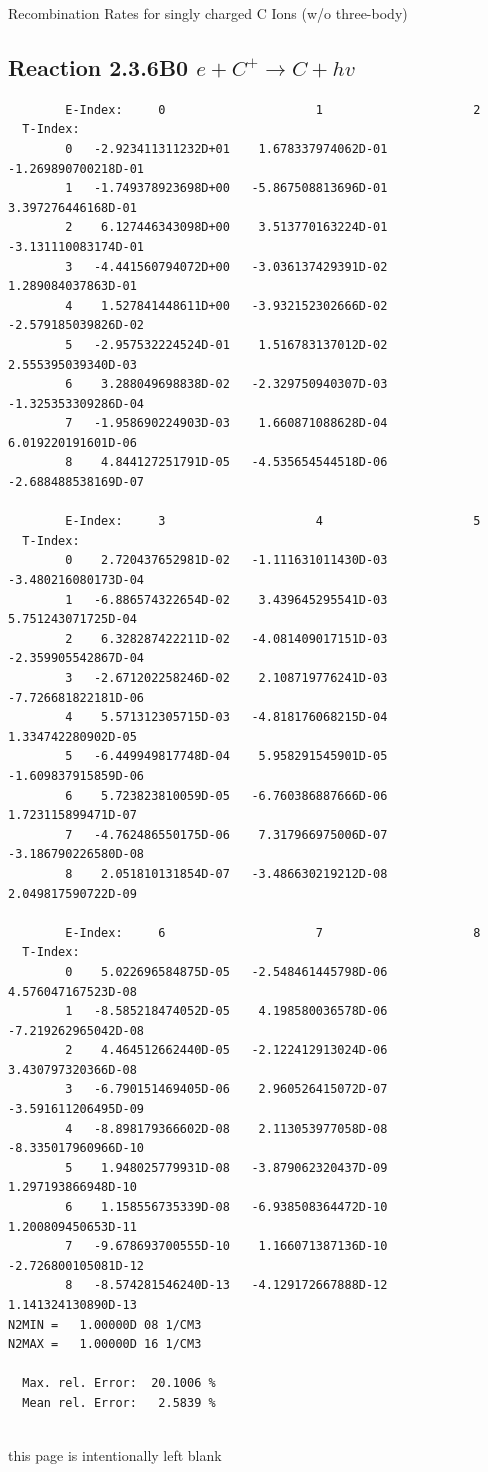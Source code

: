 \documentclass[12pt,dvipdfmx]{article}
\begin{document}
  Recombination Rates for singly charged C Ions (w/o three-body)
\subsection{
Reaction 2.3.6B0  $e + C^{+} \rightarrow C + hv$
}

\begin{small}\begin{verbatim}
        E-Index:     0                     1                     2
  T-Index:
        0   -2.923411311232D+01    1.678337974062D-01   -1.269890700218D-01
        1   -1.749378923698D+00   -5.867508813696D-01    3.397276446168D-01
        2    6.127446343098D+00    3.513770163224D-01   -3.131110083174D-01
        3   -4.441560794072D+00   -3.036137429391D-02    1.289084037863D-01
        4    1.527841448611D+00   -3.932152302666D-02   -2.579185039826D-02
        5   -2.957532224524D-01    1.516783137012D-02    2.555395039340D-03
        6    3.288049698838D-02   -2.329750940307D-03   -1.325353309286D-04
        7   -1.958690224903D-03    1.660871088628D-04    6.019220191601D-06
        8    4.844127251791D-05   -4.535654544518D-06   -2.688488538169D-07

        E-Index:     3                     4                     5
  T-Index:
        0    2.720437652981D-02   -1.111631011430D-03   -3.480216080173D-04
        1   -6.886574322654D-02    3.439645295541D-03    5.751243071725D-04
        2    6.328287422211D-02   -4.081409017151D-03   -2.359905542867D-04
        3   -2.671202258246D-02    2.108719776241D-03   -7.726681822181D-06
        4    5.571312305715D-03   -4.818176068215D-04    1.334742280902D-05
        5   -6.449949817748D-04    5.958291545901D-05   -1.609837915859D-06
        6    5.723823810059D-05   -6.760386887666D-06    1.723115899471D-07
        7   -4.762486550175D-06    7.317966975006D-07   -3.186790226580D-08
        8    2.051810131854D-07   -3.486630219212D-08    2.049817590722D-09

        E-Index:     6                     7                     8
  T-Index:
        0    5.022696584875D-05   -2.548461445798D-06    4.576047167523D-08
        1   -8.585218474052D-05    4.198580036578D-06   -7.219262965042D-08
        2    4.464512662440D-05   -2.122412913024D-06    3.430797320366D-08
        3   -6.790151469405D-06    2.960526415072D-07   -3.591611206495D-09
        4   -8.898179366602D-08    2.113053977058D-08   -8.335017960966D-10
        5    1.948025779931D-08   -3.879062320437D-09    1.297193866948D-10
        6    1.158556735339D-08   -6.938508364472D-10    1.200809450653D-11
        7   -9.678693700555D-10    1.166071387136D-10   -2.726800105081D-12
        8   -8.574281546240D-13   -4.129172667888D-12    1.141324130890D-13
N2MIN =   1.00000D 08 1/CM3
N2MAX =   1.00000D 16 1/CM3

  Max. rel. Error:  20.1006 %
  Mean rel. Error:   2.5839 %


\end{verbatim}\end{small}
\newpage
this page is intentionally left blank
\newpage
\end{document}
